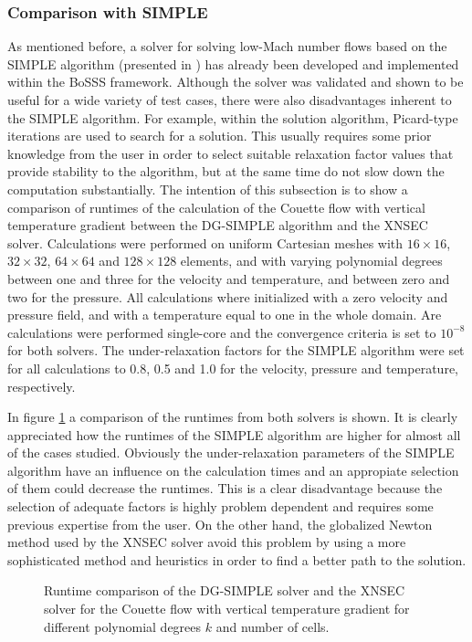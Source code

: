 \subsubsection{Comparison with SIMPLE}
As mentioned before, a solver for solving low-Mach number flows based on the SIMPLE algorithm (presented in \textcite{kleinHighorderDiscontinuousGalerkin2016}) has already been developed and implemented within the BoSSS framework.
Although the solver was validated and shown to be useful for a wide variety of test cases, there were also disadvantages inherent to the SIMPLE algorithm. For example,
within the solution algorithm, Picard-type iterations are used to search for a solution. This usually requires some prior knowledge from the user in order to select suitable relaxation factor values that provide stability to the algorithm, but at the same time do not slow down the computation substantially. 
The intention of this subsection is to show a comparison of runtimes of the calculation of the Couette flow with vertical temperature gradient between the DG-SIMPLE algorithm \parencite{kleinHighorderDiscontinuousGalerkin2016} and the XNSEC solver. Calculations were performed on uniform Cartesian meshes with $16\times16$, $32\times32$, $64\times64$ and $128\times128$ elements, and with varying polynomial degrees between one and three for the velocity and temperature, and between zero and two for the pressure. All calculations where initialized with a zero velocity and pressure field, and with a temperature equal to one in the whole domain. Are calculations were performed single-core and the convergence criteria is set to $10^{-8}$ for both solvers. The under-relaxation factors for the SIMPLE algorithm were set for all calculations to 0.8, 0.5 and 1.0 for the velocity, pressure and temperature, respectively.

In figure \cref{fig:RuntimeComparison} a comparison of the runtimes from both solvers is shown. It is clearly  appreciated how the runtimes of the SIMPLE algorithm are higher for almost all of the cases studied. Obviously the under-relaxation parameters of the SIMPLE algorithm have an influence on the calculation times and an appropiate selection of them could decrease the runtimes. This is a clear disadvantage because the selection of adequate factors is highly problem dependent and requires some previous expertise from the user. On the other hand, the globalized Newton method used by the XNSEC solver avoid this problem by using a more sophisticated method and heuristics in order to find a better path to the solution.




\begin{figure}	
\centering
	\caption{Runtime comparison of the DG-SIMPLE solver and the XNSEC solver for the Couette flow with vertical temperature gradient for different polynomial degrees $k$ and number of cells.}
	\label{fig:RuntimeComparison}
\end{figure}


